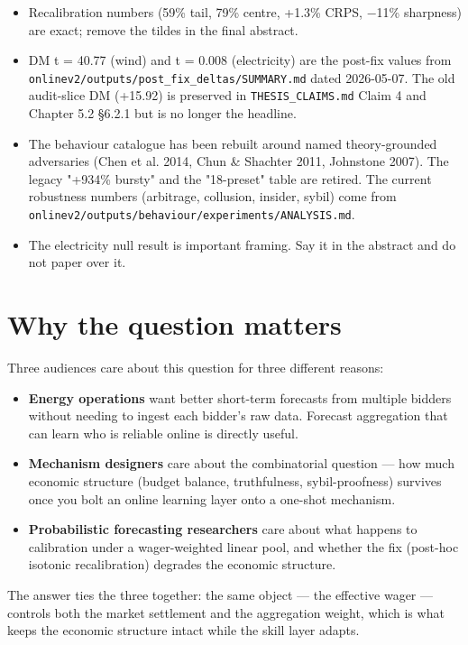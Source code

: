 \documentclass[11pt,a4paper,openany]{report}
\begin{document}
\begin{itemize}
  \item Recalibration numbers (59\% tail, 79\% centre, +1.3\% CRPS, −11\%
    sharpness) are exact; remove the tildes in the final abstract.
  \item DM t = 40.77 (wind) and t = 0.008 (electricity) are the post-fix
    values from \texttt{onlinev2/outputs/post\_fix\_deltas/SUMMARY.md} dated
    2026-05-07. The old audit-slice DM (+15.92) is preserved in
    \texttt{THESIS\_CLAIMS.md} Claim 4 and Chapter 5.2 §6.2.1 but is no longer
    the headline.
  \item The behaviour catalogue has been rebuilt around named theory-grounded
    adversaries (Chen et al. 2014, Chun \& Shachter 2011, Johnstone 2007).
    The legacy "+934\% bursty" and the "18-preset" table are retired. The
    current robustness numbers (arbitrage, collusion, insider, sybil)
    come from \texttt{onlinev2/outputs/behaviour/experiments/ANALYSIS.md}.
  \item The electricity null result is important framing. Say it in the
    abstract and do not paper over it.
\end{itemize}

\section{Why the question matters}

Three audiences care about this question for three different reasons:

\begin{itemize}
  \item \textbf{Energy operations} want better short-term forecasts from multiple
    bidders without needing to ingest each bidder's raw data. Forecast
    aggregation that can learn who is reliable online is directly useful.
  \item \textbf{Mechanism designers} care about the combinatorial question — how
    much economic structure (budget balance, truthfulness, sybil-proofness)
    survives once you bolt an online learning layer onto a one-shot
    mechanism.
  \item \textbf{Probabilistic forecasting researchers} care about what happens to
    calibration under a wager-weighted linear pool, and whether the fix
    (post-hoc isotonic recalibration) degrades the economic structure.
\end{itemize}

The answer ties the three together: the same object — the effective wager
— controls both the market settlement and the aggregation weight, which
is what keeps the economic structure intact while the skill layer adapts.
\end{document}
